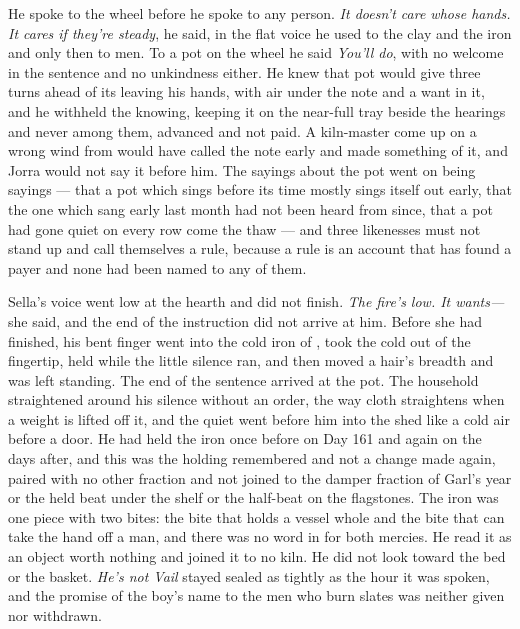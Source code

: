 He spoke to the wheel before he spoke to any person. \emph{It doesn't care whose hands. It cares if they're steady}, he said, in the flat voice he used to the clay and the iron and only then to men. To a pot on the wheel he said \emph{You'll do}, with no welcome in the sentence and no unkindness either. He knew  that pot would give three turns ahead of its leaving his hands, with air under the note and a want in it, and he withheld the knowing, keeping it on the near-full tray beside the hearings and never among them, advanced and not paid. A kiln-master come up on a wrong wind from  would have called the note early and made something of it, and Jorra would not say it before him. The sayings about the pot went on being sayings --- that a pot which sings before its time mostly sings itself out early, that the one which sang early last month had not been heard from since, that a pot had gone quiet on every row come the thaw --- and three likenesses must not stand up and call themselves a rule, because a rule is an account that has found a payer and none had been named to any of them.

Sella's voice went low at the hearth and did not finish. \emph{The fire's low. It wants---} she said, and the end of the instruction did not arrive at him. Before she had finished, his bent finger went into the cold iron of , took the cold out of the fingertip, held while the little silence ran, and then moved a hair's breadth and was left standing. The end of the sentence arrived at the pot. The household straightened around his silence without an order, the way cloth straightens when a weight is lifted off it, and the quiet went before him into the shed like a cold air before a door. He had held the iron once before on Day 161 and again on the days after, and this was the holding remembered and not a change made again, paired with no other fraction and not joined to the damper fraction of Garl's year or the held beat under the shelf or the half-beat on the flagstones. The iron was one piece with two bites: the bite that holds a vessel whole and the bite that can take the hand off a man, and there was no word in  for both mercies. He read it as an object worth nothing and joined it to no kiln. He did not look toward the bed or the basket. \emph{He's not Vail} stayed sealed as tightly as the hour it was spoken, and the promise of the boy's name to the men who burn slates was neither given nor withdrawn.

\scenebreak

